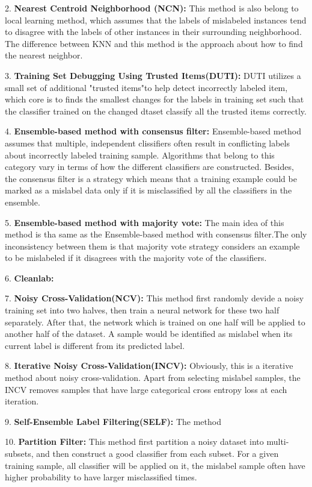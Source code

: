 2. \textbf{Nearest Centroid Neighborhood (NCN):} This method is also belong to local learning method, which assumes that the labels of mislabeled instances tend to disagree with the labels of other instances in their surrounding neighborhood. The difference between KNN and this method is the approach about how to find the nearest neighbor.

3. \textbf{Training Set Debugging Using Trusted Items(DUTI):} DUTI utilizes a small set of additional "trusted items"to help detect incorrectly labeled item, which core is to finds the smallest changes for the labels in training set such that the classifier trained on the changed dtaset classify all the trusted items correctly.

4. \textbf{Ensemble-based method with consensus filter:}  Ensemble-based method assumes that multiple, independent clissifiers often result in conflicting labels about incorrectly labeled training sample. Algorithms that belong to this category vary in terms of how the different classifiers are constructed. Besides, the consensus filter is a strategy which means that a training example could be marked as a mislabel data only if it is misclassified by all the classifiers in the ensemble.

5. \textbf{Ensemble-based method with majority vote:}  The main idea of this method is tha same as the Ensemble-based method with consensus filter.The only inconsistency between them is that majority vote strategy considers an example to be mislabeled if it disagrees with the majority vote of the classifiers.

6. \textbf{Cleanlab:} 

7. \textbf{Noisy Cross-Validation(NCV):} This method first randomly devide a noisy training set into two halves, then train a neural network for these two half separately. After that, the network which is trained on one half will be applied to another half of the dataset. A sample would be identified as mislabel when its current label is different from its predicted label.

8. \textbf{Iterative Noisy Cross-Validation(INCV):} Obviously, this is a iterative method about noisy cross-validation. Apart from selecting mislabel samples, the INCV removes samples that have large categorical cross entropy loss at each iteration.

9. \textbf{Self-Ensemble Label Filtering(SELF):} The method 

10. \textbf{Partition Filter:} This method first partition a noisy dataset into multi-subsets, and then construct a good classifier from each subset. For a given training sample, all classifier will be applied on it, the mislabel sample often have higher probability to have larger misclassified times.

